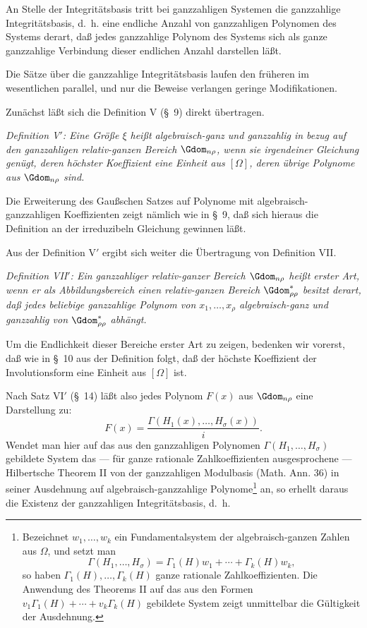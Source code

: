 \documentclass[11pt]{article}
\begin{document}
An Stelle der Integritätsbasis tritt bei ganzzahligen Systemen die ganzzahlige Integritätsbasis, d.~h. eine endliche Anzahl von ganzzahligen Polynomen des Systems derart, daß jedes ganzzahlige Polynom des Systems sich als ganze ganzzahlige Verbindung dieser endlichen Anzahl darstellen läßt.

Die Sätze über die ganzzahlige Integritätsbasis laufen den früheren im wesentlichen parallel, und nur die Beweise verlangen geringe Modifikationen.

Zunächst läßt sich die Definition V (\S\ 9) direkt übertragen.

\emph{Definition V$'$: Eine Größe $\xi$ heißt algebraisch-ganz und ganzzahlig in bezug auf den ganzzahligen relativ-ganzen Bereich $\Gdom_{n\rho}$, wenn sie irgendeiner Gleichung genügt, deren höchster Koeffizient eine Einheit aus $[\Omega]$, deren übrige Polynome aus $\Gdom_{n\rho}$ sind.}

Die Erweiterung des Gaußschen Satzes auf Polynome mit algebraisch-ganzzahligen Koeffizienten zeigt nämlich wie in \S\ 9, daß sich hieraus die Definition an der irreduzibeln Gleichung gewinnen läßt.

Aus der Definition V$'$ ergibt sich weiter die Übertragung von Definition VII.

\emph{Definition VII$'$: Ein ganzzahliger relativ-ganzer Bereich $\Gdom_{n\rho}$ heißt erster Art, wenn er als Abbildungsbereich einen relativ-ganzen Bereich $\Gdom^*_{\rho\rho}$ besitzt derart, daß jedes beliebige ganzzahlige Polynom von $x_1,
\ldots,x_\rho$ algebraisch-ganz und ganzzahlig von $\Gdom^*_{\rho\rho}$ abhängt.}

Um die Endlichkeit dieser Bereiche erster Art zu zeigen, bedenken wir vorerst, daß wie in \S\ 10 aus der Definition folgt, daß der höchste Koeffizient der Involutionsform eine Einheit aus $[\Omega]$ ist.

Nach Satz VI$'$ (\S\ 14) läßt also jedes Polynom $F(x)$ aus $\Gdom_{n\rho}$ eine Darstellung zu:
\[
  F(x)=\frac{\Gamma(H_1(x),\ldots,H_\sigma(x))}{i}.
\]
Wendet man hier auf das aus den ganzzahligen Polynomen $\Gamma(H_1,
\ldots,H_\sigma)$ gebildete System das --- für ganze rationale Zahlkoeffizienten ausgesprochene --- Hilbertsche Theorem II von der ganzzahligen Modulbasis (Math. Ann. 36) in seiner Ausdehnung auf algebraisch-ganzzahlige Polynome\footnote{Bezeichnet $w_1,
\ldots,w_k$ ein Fundamentalsystem der algebraisch-ganzen Zahlen aus $\Omega$, und setzt man
\[
  \Gamma(H_1,
\ldots,H_\sigma)=\Gamma_1(H)w_1+\cdots+\Gamma_k(H)w_k,
\]
so haben $\Gamma_1(H),
\ldots,\Gamma_k(H)$ ganze rationale Zahlkoeffizienten. Die Anwendung des Theorems II auf das aus den Formen $v_1\Gamma_1(H)+\cdots+v_k\Gamma_k(H)$ gebildete System zeigt unmittelbar die Gültigkeit der Ausdehnung.} an, so erhellt daraus die Existenz der ganzzahligen Integritätsbasis, d.~h.
\end{document}
